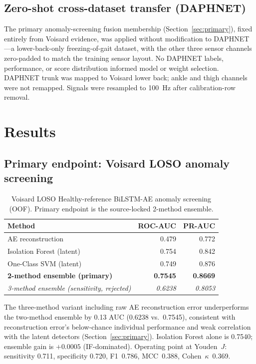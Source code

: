 \documentclass[11pt,a4paper]{article}
\begin{document}
\subsection{Zero-shot cross-dataset transfer (DAPHNET)}
\label{sec:daphnet}

The primary anomaly-screening fusion membership (Section~\ref{sec:primary}), fixed entirely from Voisard evidence, was applied without modification to DAPHNET---a lower-back-only freezing-of-gait dataset, with the other three sensor channels zero-padded to match the training sensor layout. No DAPHNET labels, performance, or score distribution informed model or weight selection. DAPHNET trunk was mapped to Voisard lower back; ankle and thigh channels were not remapped. Signals were resampled to 100~Hz after calibration-row removal.

\section{Results}

\subsection{Primary endpoint: Voisard LOSO anomaly screening}

\begin{table}[ht]
\centering
\caption{Voisard LOSO Healthy-reference BiLSTM-AE anomaly screening (OOF). Primary endpoint is the source-locked 2-method ensemble.}
\label{tab:voisard-ae}
\begin{tabular}{lrr}
\toprule
Method & ROC-AUC & PR-AUC \\
\midrule
AE reconstruction & 0.479 & 0.772 \\
Isolation Forest (latent) & 0.754 & 0.842 \\
One-Class SVM (latent) & 0.749 & 0.876 \\
\textbf{2-method ensemble (primary)} & \textbf{0.7545} & \textbf{0.8669} \\
\textit{3-method ensemble (sensitivity, rejected)} & \textit{0.6238} & \textit{0.8053} \\
\bottomrule
\end{tabular}
\end{table}

The three-method variant including raw AE reconstruction error underperforms the two-method ensemble by 0.13 AUC (0.6238 vs.\ 0.7545), consistent with reconstruction error's below-chance individual performance and weak correlation with the latent detectors (Section~\ref{sec:primary}). Isolation Forest alone is 0.7540; ensemble gain is $+0.0005$ (IF-dominated). Operating point at Youden~$J$: sensitivity 0.711, specificity 0.720, F1~0.786, MCC~0.388, Cohen~$\kappa$~0.369.
\end{document}
